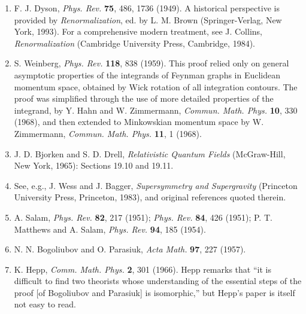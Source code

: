 


\begin{enumerate}
\item\label{ref:12.1} F. J. Dyson, \emph{Phys. Rev.} \textbf{75}, 486, 1736
(1949). A historical perspective is provided by \emph{Renormalization}, ed. by
L. M. Brown (Springer-Verlag, New York, 1993). For a comprehensive modern
treatment, see J. Collins, \emph{Renormalization} (Cambridge University Press,
Cambridge, 1984).

\item\label{ref:12.2} S. Weinberg, \emph{Phys. Rev.} \textbf{118}, 838 (1959).
This proof relied only on general asymptotic properties of the integrands of
Feynman graphs in Euclidean momentum space, obtained by Wick rotation of all
integration contours. The proof was simplified through the use of more
detailed properties of the integrand, by Y. Hahn and W. Zimmermann,
\emph{Commun. Math. Phys.} \textbf{10}, 330 (1968), and then extended to
Minkowskian momentum space by W. Zimmermann, \emph{Commun. Math. Phys.}
\textbf{11}, 1 (1968).

\item\label{ref:12.3} J. D. Bjorken and S. D. Drell, \emph{Relativistic
Quantum Fields} (McGraw-Hill, New York, 1965): Sections 19.10 and 19.11.

\item\label{ref:12.4} See, e.g., J. Wess and J. Bagger,
\emph{Supersymmetry and Supergravity} (Princeton University Press, Princeton,
1983), and original references quoted therein.

\item\label{ref:12.5} A. Salam, \emph{Phys. Rev.} \textbf{82}, 217 (1951);
\emph{Phys. Rev.} \textbf{84}, 426 (1951); P. T. Matthews and A. Salam,
\emph{Phys. Rev.} \textbf{94}, 185 (1954).

\item\label{ref:12.6} N. N. Bogoliubov and O. Parasiuk, \emph{Acta Math.}
\textbf{97}, 227 (1957).

\item\label{ref:12.7} K. Hepp, \emph{Comm. Math. Phys.} \textbf{2}, 301
(1966). Hepp remarks that \textquotedblleft it is difficult to find two
theorists whose understanding of the essential steps of the proof [of
Bogoliubov and Parasiuk] is isomorphic,\textquotedblright{} but Hepp's paper is
itself not easy to read.


\end{enumerate}
